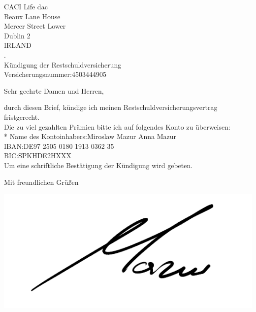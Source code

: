 \documentclass[12pt,a4paper]{letter}
\begin{document}
\begin{letter}{CACI Life dac\\Beaux Lane House\\Mercer Street Lower\\Dublin 2\\IRLAND\\.\\K\"undigung der Restschuldversicherung\\Versicherungsnummer:4503444905}
\opening{Sehr geehrte Damen und Herren,}
durch diesen Brief, k\"undige ich meinen Restschuldversicherungsvertrag fristgerecht.\\
Die zu viel gezahlten Pr\"amien bitte ich auf folgendes Konto zu \"uberweisen:\\*
Name des Kontoinhabers:Miroslaw Mazur Anna Mazur\\
IBAN:DE97 2505 0180 1913 0362 35\\
BIC:SPKHDE2HXXX\\

Um eine schriftliche Best\"atigung der K\"undigung wird gebeten.\\

\closing{Mit freundlichen Gr\"u\ss en}
\includegraphics[width=0.4\linewidth,height=0.1\textheight]{Miroslaw_Mazur_Sign.png}
\end{letter}
\end{document}
